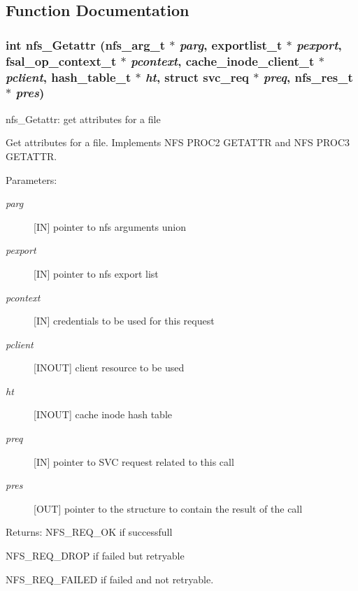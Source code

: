 \subsection{Function Documentation}
\subsubsection[{nfs\_\-Getattr}]{\setlength{\rightskip}{0pt plus 5cm}int nfs\_\-Getattr (nfs\_\-arg\_\-t $\ast$ {\em parg}, \/  exportlist\_\-t $\ast$ {\em pexport}, \/  fsal\_\-op\_\-context\_\-t $\ast$ {\em pcontext}, \/  cache\_\-inode\_\-client\_\-t $\ast$ {\em pclient}, \/  hash\_\-table\_\-t $\ast$ {\em ht}, \/  struct svc\_\-req $\ast$ {\em preq}, \/  nfs\_\-res\_\-t $\ast$ {\em pres})}\label{nfs__Getattr_8c_17ae7823b8bce41be82ad3a08f9cb45c}


nfs\_\-Getattr: get attributes for a file

Get attributes for a file. Implements NFS PROC2 GETATTR and NFS PROC3 GETATTR.

\begin{Desc}
\item[Parameters:]
\begin{description}
\item[{\em parg}][IN] pointer to nfs arguments union \item[{\em pexport}][IN] pointer to nfs export list \item[{\em pcontext}][IN] credentials to be used for this request \item[{\em pclient}][INOUT] client resource to be used \item[{\em ht}][INOUT] cache inode hash table \item[{\em preq}][IN] pointer to SVC request related to this call \item[{\em pres}][OUT] pointer to the structure to contain the result of the call\end{description}
\end{Desc}
\begin{Desc}
\item[Returns:]NFS\_\-REQ\_\-OK if successfull \par
 NFS\_\-REQ\_\-DROP if failed but retryable \par
 NFS\_\-REQ\_\-FAILED if failed and not retryable. \end{Desc}


